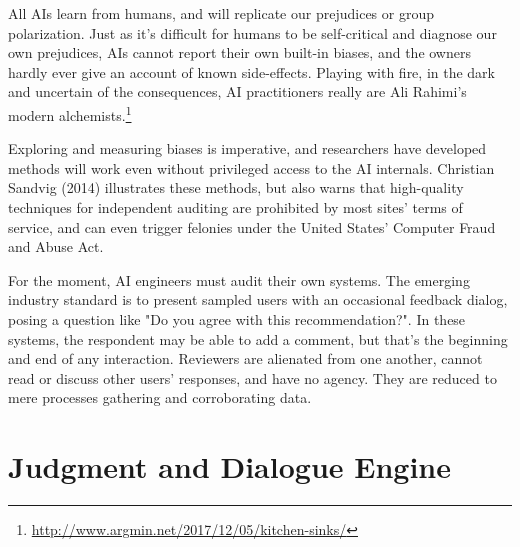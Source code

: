 \documentclass[format=sigconf]{acmart}
\begin{document}
All AIs learn from humans, and will replicate our prejudices or group polarization.  Just as it's difficult for humans to be self-critical and diagnose our own prejudices, AIs cannot report their own built-in biases, and the owners hardly ever give an account of known side-effects.  Playing with fire, in the dark and uncertain of the consequences, AI practitioners really are Ali Rahimi's modern alchemists.\footnote{\url{http://www.argmin.net/2017/12/05/kitchen-sinks/}}

Exploring and measuring biases is imperative, and researchers have developed methods will work even without privileged access to the AI internals.  Christian Sandvig (2014) \citep{Sandvig} illustrates these methods, but also warns that high-quality techniques for independent auditing are prohibited by most sites' terms of service, and can even trigger felonies under the United States' Computer Fraud and Abuse Act.

For the moment, AI engineers must audit their own systems.  The emerging industry standard is to present sampled users with an occasional feedback dialog, posing a question like "Do you agree with this recommendation?".  In these systems, the respondent may be able to add a comment, but that's the beginning and end of any interaction.  Reviewers are alienated from one another, cannot read or discuss other users' responses, and have no agency.  They are reduced to mere processes gathering and corroborating data.

\section{Judgment and Dialogue Engine}
\end{document}
